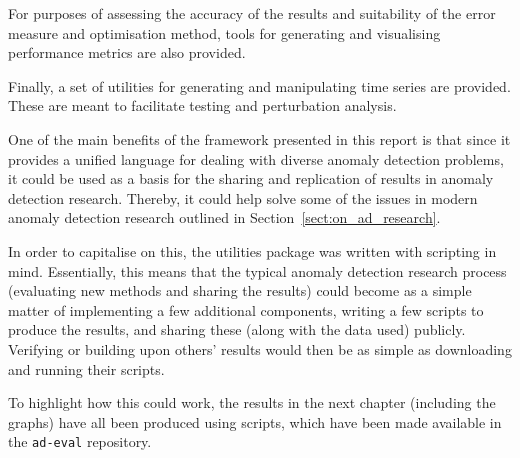 For purposes of assessing the accuracy of the results and suitability of the error measure and optimisation method, tools for generating and visualising performance metrics are also provided.

Finally, a set of utilities for generating and manipulating time series are provided. These are meant to facilitate testing and perturbation analysis.

One of the main benefits of the framework presented in this report is that since it provides a unified language for dealing with diverse anomaly detection problems, it could be used as a basis for the sharing and replication of results in anomaly detection research. Thereby, it could help solve some of the issues in modern anomaly detection research outlined in Section~\ref{sect:on_ad_research}.

In order to capitalise on this, the utilities package was written with scripting in mind. Essentially, this means that the typical anomaly detection research process (evaluating new methods and sharing the results) could become as a simple matter of implementing a few additional components, writing a few scripts to produce the results, and sharing these (along with the data used) publicly. Verifying or building upon others' results would then be as simple as downloading and running their scripts.

To highlight how this could work, the results in the next chapter (including the graphs) have all been produced using scripts, which have been made available in the \texttt{ad-eval} repository.

